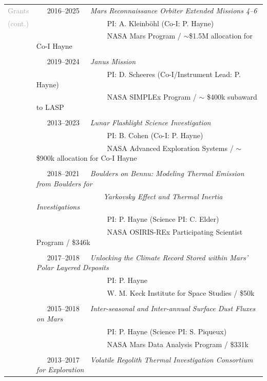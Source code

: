 \documentclass[letterpaper,10pt,twoside]{article}
\begin{document}
\noindent \begin{tabular}{@{} l l}
\large{\textcolor{darkgray}{Grants}} & ~~~2016--2025~~~\textit{Mars Reconnaissance Orbiter Extended Missions 4--6} \\
\large{\textcolor{darkgray}{(cont.)}} & ~~~~~~~~~~~~~~~~ ~~~PI: A. Kleinböhl (Co-I: P. Hayne) \\
 & ~~~~~~~~~~~~~~~~ ~~~NASA Mars Program / $\sim$\$1.5M allocation for Co-I Hayne \\
 & \\
& ~~~2019--2024~~~\textit{Janus Mission} \\
 & ~~~~~~~~~~~~~~~~ ~~~PI: D. Scheeres (Co-I/Instrument Lead: P. Hayne) \\
 & ~~~~~~~~~~~~~~~~ ~~~NASA SIMPLEx Program / $\sim$ \$400k subaward to LASP\\
 & \\
 & ~~~2013--2023~~~\textit{Lunar Flashlight Science Investigation} \\
& ~~~~~~~~~~~~~~~~ ~~~PI: B. Cohen (Co-I: P. Hayne) \\
 & ~~~~~~~~~~~~~~~~ ~~~NASA Advanced Exploration Systems / $\sim$\$900k allocation for Co-I Hayne\\
 & \\
 & ~~~2018--2021~~~\textit{Boulders on Bennu: Modeling Thermal Emission from Boulders for}\\
 & ~~~~~~~~~~~~~~~~ ~~\textit{Yarkovsky Effect and Thermal Inertia Investigations}\\
& ~~~~~~~~~~~~~~~~ ~~~PI: P. Hayne (Science PI: C. Elder)\\
 & ~~~~~~~~~~~~~~~~ ~~~NASA OSIRIS-REx Participating Scientist Program / \$346k \\
 & \\
 & ~~~2017--2018~~~\textit{Unlocking the Climate Record Stored within Mars' Polar Layered Deposits} \\
 & ~~~~~~~~~~~~~~~~ ~~~PI: P. Hayne \\
 & ~~~~~~~~~~~~~~~~ ~~~W. M. Keck Institute for Space Studies / \$50k \\
 & \\
 & ~~~2015--2018~~~\textit{Inter-seasonal and Inter-annual Surface Dust Fluxes on Mars} \\
 & ~~~~~~~~~~~~~~~~ ~~~PI: P. Hayne (Science PI: S. Piqueux) \\
 & ~~~~~~~~~~~~~~~~ ~~~NASA Mars Data Analysis Program / \$331k \\
 & \\
 & ~~~2013--2017~~~\textit{Volatile Regolith Thermal Investigation Consortium for Exploration} \\

\end{tabular}
\end{document}
